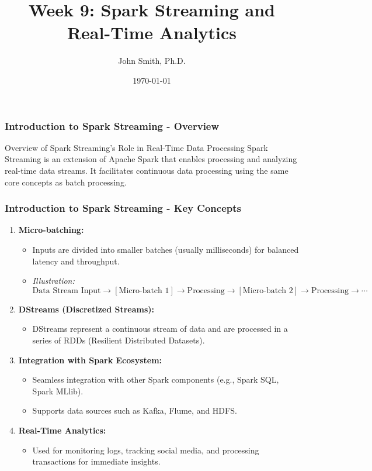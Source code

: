 \documentclass[aspectratio=169]{beamer}
\title[Spark Streaming]{Week 9: Spark Streaming and Real-Time Analytics}
\author[J. Smith]{John Smith, Ph.D.}
\institute[University Name]{
  Department of Computer Science\\
  University Name\\
  \vspace{0.3cm}
  Email: email@university.edu\\
  Website: www.university.edu
}
\date{\today}
\begin{document}
\frame{\titlepage}

\begin{frame}[fragile]
    \frametitle{Introduction to Spark Streaming - Overview}
    \begin{block}{Overview of Spark Streaming's Role in Real-Time Data Processing}
        Spark Streaming is an extension of Apache Spark that enables processing and analyzing real-time data streams. It facilitates continuous data processing using the same core concepts as batch processing.
    \end{block}
\end{frame}

\begin{frame}[fragile]
    \frametitle{Introduction to Spark Streaming - Key Concepts}
    \begin{enumerate}
        \item \textbf{Micro-batching:} 
        \begin{itemize}
            \item Inputs are divided into smaller batches (usually milliseconds) for balanced latency and throughput.
            \item \textit{Illustration:} 
            \[
            \text{Data Stream Input} \rightarrow [\text{Micro-batch 1}] \rightarrow \text{Processing} \rightarrow [\text{Micro-batch 2}] \rightarrow \text{Processing} \rightarrow \cdots
            \]
        \end{itemize}
        
        \item \textbf{DStreams (Discretized Streams):} 
        \begin{itemize}
            \item DStreams represent a continuous stream of data and are processed in a series of RDDs (Resilient Distributed Datasets).
        \end{itemize}
        
        \item \textbf{Integration with Spark Ecosystem:}
        \begin{itemize}
            \item Seamless integration with other Spark components (e.g., Spark SQL, Spark MLlib).
            \item Supports data sources such as Kafka, Flume, and HDFS.
        \end{itemize}
        
        \item \textbf{Real-Time Analytics:}
        \begin{itemize}
            \item Used for monitoring logs, tracking social media, and processing transactions for immediate insights.
        \end{itemize}
    \end{enumerate}
\end{frame}
\end{document}
